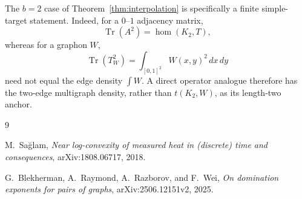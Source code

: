 \documentclass[11pt]{article}
\theoremstyle{definition}
\theoremstyle{remark}
\newcommand{\homn}{\operatorname{hom}}
\newcommand{\tr}{\operatorname{Tr}}
\begin{document}
The $b=2$ case of Theorem~\ref{thm:interpolation} is specifically a
finite simple-target statement.  Indeed, for a $0$--$1$ adjacency
matrix,
\[
  \tr(A^2)=\homn(K_2,T),
\]
whereas for a graphon $W$,
\[
  \tr(T_W^2)
  =\int_{[0,1]^2}W(x,y)^2\,dx\,dy
\]
need not equal the edge density $\int W$.  A direct operator analogue
therefore has the two-edge multigraph density, rather than
$t(K_2,W)$, as its length-two anchor.

\begin{thebibliography}{9}

M.~Sa\u{g}lam,
\emph{Near log-convexity of measured heat in (discrete) time and consequences},
arXiv:1808.06717, 2018.

G.~Blekherman, A.~Raymond, A.~Razborov, and F.~Wei,
\emph{On domination exponents for pairs of graphs},
arXiv:2506.12151v2, 2025.

\end{thebibliography}
\end{document}
